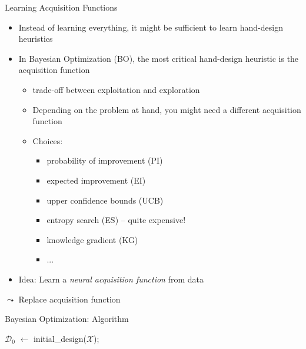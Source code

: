 \begin{frame}[c, fragile]{Learning Acquisition Functions }

\begin{itemize}
\item Instead of learning everything, it might be sufficient to \alert{learn hand-design heuristics}
\pause
\item In Bayesian Optimization (BO), the most critical hand-design heuristic is the acquisition function
\begin{itemize}
\item trade-off between exploitation and exploration
\item Depending on the problem at hand, you might need a different acquisition function
\pause
\item Choices:
\begin{itemize}
\item probability of improvement (PI)
\item expected improvement (EI)
\item upper confidence bounds (UCB)
\item entropy search (ES) -- quite expensive!
\item knowledge gradient (KG)
\item ...
\end{itemize} 
\end{itemize}
\pause
\item \alert{Idea:} Learn a \emph{neural acquisition function} from data
\end{itemize}

$\leadsto$ Replace acquisition function 

\end{frame}
\begin{frame}[c,fragile]{Bayesian Optimization: Algorithm}

\begin{algorithm}[H]
\BlankLine
$\mathcal{D}_0$ $\leftarrow$ initial\_design($\mathcal{X}$); \\
\caption{Bayesian Optimization (BO)}
\end{algorithm}


\end{frame}
